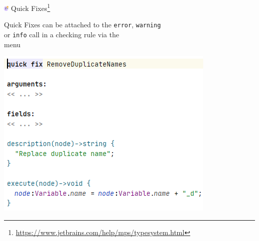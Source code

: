 	\begin{frame}{\includegraphics[height=0.25cm]{graphics/quickfix.png} Quick Fixes\footnote{\url{https://www.jetbrains.com/help/mps/typesystem.html}}}
		\begin{minipage}{0.52\textwidth}
			Quick Fixes can be attached to the \texttt{error}, \texttt{warning}\\
			or \texttt{info} call in a checking rule via the \\
			\menu{\workshopinspector{}} menu
		\end{minipage}
		\begin{minipage}{0.4\textwidth}
			\includegraphics[height=0.8\textheight]{illustrations/quickfix.png}
		\end{minipage}
	\end{frame}

